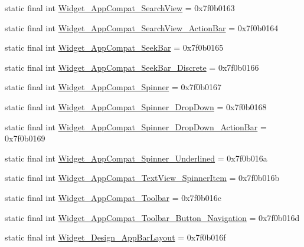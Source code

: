 \begin{CompactItemize}
\item 
static final int \hyperlink{classandroid_1_1support_1_1v7_1_1cardview_1_1_r_1_1style_24accf2278f2fb2b161d62e59bbf3b0e}{Widget\_\-AppCompat\_\-SearchView} = 0x7f0b0163
\item 
static final int \hyperlink{classandroid_1_1support_1_1v7_1_1cardview_1_1_r_1_1style_e538c8a1e54ba2e98953d349cb6e925e}{Widget\_\-AppCompat\_\-SearchView\_\-ActionBar} = 0x7f0b0164
\item 
static final int \hyperlink{classandroid_1_1support_1_1v7_1_1cardview_1_1_r_1_1style_d0a340b02c9191875cdc8c3692ddbb4a}{Widget\_\-AppCompat\_\-SeekBar} = 0x7f0b0165
\item 
static final int \hyperlink{classandroid_1_1support_1_1v7_1_1cardview_1_1_r_1_1style_81bb4c3fd7466214c8c394b736b894e9}{Widget\_\-AppCompat\_\-SeekBar\_\-Discrete} = 0x7f0b0166
\item 
static final int \hyperlink{classandroid_1_1support_1_1v7_1_1cardview_1_1_r_1_1style_b5d93a2d394a7ad004312828a1272d32}{Widget\_\-AppCompat\_\-Spinner} = 0x7f0b0167
\item 
static final int \hyperlink{classandroid_1_1support_1_1v7_1_1cardview_1_1_r_1_1style_740eb90dfc52088747b95ce2dcb2b9a6}{Widget\_\-AppCompat\_\-Spinner\_\-DropDown} = 0x7f0b0168
\item 
static final int \hyperlink{classandroid_1_1support_1_1v7_1_1cardview_1_1_r_1_1style_7fcec8d5f07a274a5fc8e28e9c08205a}{Widget\_\-AppCompat\_\-Spinner\_\-DropDown\_\-ActionBar} = 0x7f0b0169
\item 
static final int \hyperlink{classandroid_1_1support_1_1v7_1_1cardview_1_1_r_1_1style_a741ed58e61ca6e081b69b93c524ff51}{Widget\_\-AppCompat\_\-Spinner\_\-Underlined} = 0x7f0b016a
\item 
static final int \hyperlink{classandroid_1_1support_1_1v7_1_1cardview_1_1_r_1_1style_43e00999a670c7e544658b92985992ee}{Widget\_\-AppCompat\_\-TextView\_\-SpinnerItem} = 0x7f0b016b
\item 
static final int \hyperlink{classandroid_1_1support_1_1v7_1_1cardview_1_1_r_1_1style_bdcf926f73759c547942767133cf3d19}{Widget\_\-AppCompat\_\-Toolbar} = 0x7f0b016c
\item 
static final int \hyperlink{classandroid_1_1support_1_1v7_1_1cardview_1_1_r_1_1style_e7c2d53f13760158dd2690fe2037e6cf}{Widget\_\-AppCompat\_\-Toolbar\_\-Button\_\-Navigation} = 0x7f0b016d
\item 
static final int \hyperlink{classandroid_1_1support_1_1v7_1_1cardview_1_1_r_1_1style_811bce44adce0cda16b393dfe94bcd75}{Widget\_\-Design\_\-AppBarLayout} = 0x7f0b016f

\end{CompactItemize}

